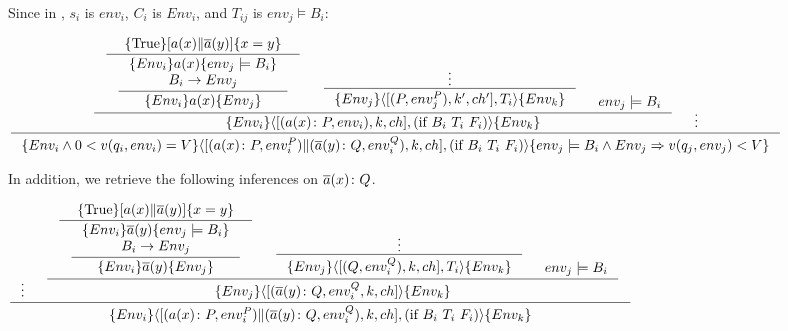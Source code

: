 \documentclass[12pt,a4paper,titlepage]{article}
\theoremstyle{break}
\begin{document}
Since in \NHK, \(s_i\) is \(env_i\), \(C_i\) is \(Env_i\), and \(T_{ij}\) is \(env_j\models B_i\):
  \begin{center}
    \begin{math}
\inference{
  \inference{
    \inference{\{\Truerm\}[a(x)\|\bijection{a}(y)]\{x=y\}}
    {\inference{\{Env_i\}a(x)\{env_j\models B_i\}\\
                  B_i\rightarrow Env_j} {\{Env_i\}a(x)\{Env_j\}}}&
     \inference{\vdots}
     {\{Env_j\}\langle[(P,env_j^P),k',ch'],T_i\rangle\{Env_k\}}&env_j\models B_i}
  {\{Env_i\}\langle[(a(x)\colon P,env_i),k,ch],(\mbox{if}\ B_i\ T_i\ F_i)\rangle\{Env_k\}}&\vdots}
{\{Env_i\wedge 0<v(q_i,env_i)=V\}\langle[(a(x)\colon P,env_i^P)\|(\bijection{a}(y)\colon Q,env_i^Q),k,ch],(\mbox{if}\ B_i\ T_i\ F_i)\rangle\{env_j\models B_i\wedge Env_j\Rightarrow v(q_j,env_j)<V\}}
    \end{math}
  \end{center}
In addition, we retrieve the following inferences on \(\mbox{$\overline{a}$}(x)\colon Q\).
  \begin{center}
    \begin{math}
\inference{
  \vdots&
    \inference{\inference{\{\Truerm\}[a(x)\|\bijection{a}(y)]\{x=y\}}
               {\inference{\{Env_i\}\bijection{a}(y)\{env_j\models B_i\}\\B_i\rightarrow Env_j}
                {\{Env_i\}\bijection{a}(y)\{Env_j\}}}&
                   \inference{\vdots}
                   {\{Env_j\}\langle[(Q,env_i^Q),k,ch],T_i\rangle\{Env_k\}}&env_j\models B_i}
   {\{Env_j\}\langle[(\bijection{a}(y)\colon Q,env_i^Q,k,ch]\rangle\{Env_k\}}}
{\{Env_i\}\langle[(a(x)\colon P,env_i^P)\|(\bijection{a}(y)\colon Q,env_i^Q),k,ch],(\mbox{if}\ B_i\ T_i\ F_i)\rangle\{Env_k\}}
    \end{math}
  \end{center}
%
%
%
%


\end{document}

